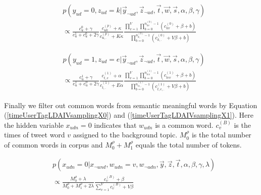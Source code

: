 \documentclass{llncs}
\begin{document}
\begin{scriptsize}
\begin{equation}
\label{timeUserTagLDAIVJointSamplingForY0Z}
\begin{aligned}
&p(y_{ud}=0,z_{ud}=k|\vec{y}_{\neg{ud}},\vec{z}_{\neg{ud}},\vec{t},\vec{w},\vec{s},\alpha,\beta,\gamma)\\
&\propto \frac{c_u^{0}+\gamma}{c_u^{1}+c_u^{0}+2\gamma}\frac{c^{(p)}_{uk}+\kappa}{c^{(p)}_{u,.}+K\kappa}
        \frac{\prod_{v=1}^{V}\prod_{b=0}^{n^{(0)}_{kv}-1}{(c^{(0)}_{kv}+\beta+b)}  }{\prod_{b=0}^{n^{(0)}_{k,.}-1}(c^{(0)}_{k,.}+V\beta+b) }
\end{aligned}
\end{equation}
\end{scriptsize}

\begin{scriptsize}
\begin{equation}
\label{timeUserTagLDAIVJointSamplingForY1Z}
\begin{aligned}
&p(y_{ud}=1,z_{ud}=e|\vec{y}_{\neg{ud}},\vec{z}_{\neg{ud}},\vec{t},\vec{w},\vec{s},\alpha,\beta,\gamma)\\
&\propto \frac{c_u^{1}+\gamma}{c_u^{1}+c_u^{0}+2\gamma}\frac{c_{t,e}^{(1)}+\alpha}{c_{t,.}^{(1)}+E\alpha}
\frac{\prod_{v=1}^{V}\prod_{b=0}^{n^{(1)}_{tev}-1}(c^{(1)}_{tev}+\beta+b)}{\prod_{b=0}^{n^{(1)}_{te,.}-1}(c^{(1)}_{t,e,.}+V\beta+b)}
\end{aligned}
\end{equation}
\end{scriptsize}

Finally we filter out common words from semantic meaningful words by Equation (\ref{timeUserTagLDAIVsamplingX0}) and (\ref{timeUserTagLDAIVsamplingX1}).
Here the hidden variable \(x_{udn}=0\) indicates that \(w_{udn}\) is a common word.
\(c^{(B)}_v\) is the times of tweet word \(v\) assigned to the background topic.
\(M^{\rho}_0\) is the total number of common words in corpus and \(M^{\rho}_0+M^{\rho}_1\) equals the total number of tokens.

\begin{scriptsize}
\begin{equation}
\label{timeUserTagLDAIVsamplingX0}
\begin{aligned}
&p(x_{udn}=0|x_{\neg{und}},w_{udn}=v,w_{\neg{udn}},\vec{y},\vec{z},\vec{t},\alpha,\beta,\gamma,\lambda)\\
&\propto \frac{M^{\rho}_0+\lambda}{M^{\rho}_0+M^{\rho}_1+2\lambda}\frac{c^{(B)}_v+\beta}{\sum_{v=1}^{V}c^{(B)}_v+V\beta}
\end{aligned}
\end{equation}
\end{scriptsize}
\end{document}
